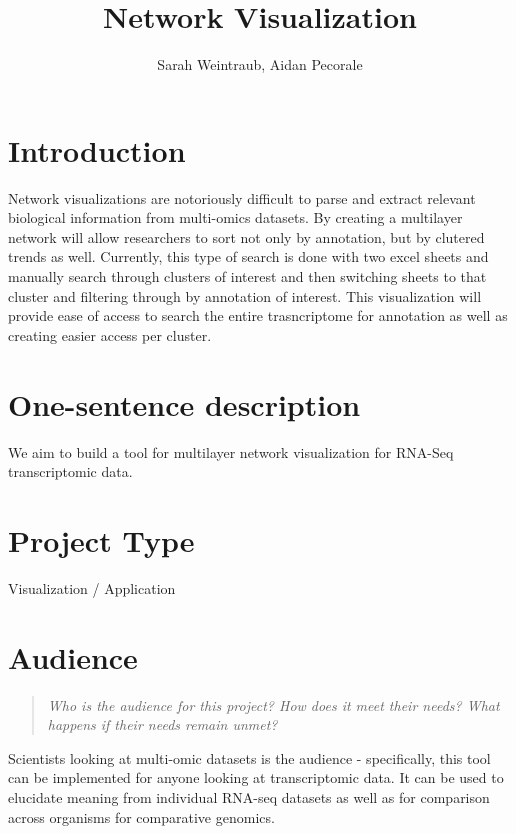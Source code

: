 \documentclass{proc}
\begin{document}
\title{Network Visualization}

\author{Sarah Weintraub, Aidan Pecorale }

\maketitle

\section{Introduction}

Network visualizations are notoriously difficult to parse and extract relevant biological information from multi-omics datasets. By creating a multilayer network will allow researchers to sort not only by annotation, but by clutered trends as well. Currently, this type of search is done with two excel sheets and manually search through clusters of interest and then switching sheets to that cluster and filtering through by annotation of interest. This visualization will provide ease of access to search the entire trasncriptome for annotation as well as creating easier access per cluster.

\section{One-sentence description}

We aim to build a tool for multilayer network visualization for RNA-Seq transcriptomic data.

\section{Project Type}

Visualization / Application

\section{Audience} 
\begin{quote}
\textit{Who is the audience for this project? 
How does it meet their needs? 
What happens if their needs remain unmet?}
\end{quote}

Scientists looking at multi-omic datasets is the audience - specifically, this tool can be implemented for anyone looking at transcriptomic data. It can be used to elucidate meaning from individual RNA-seq datasets as well as for comparison across organisms for comparative genomics. 
\end{document}
